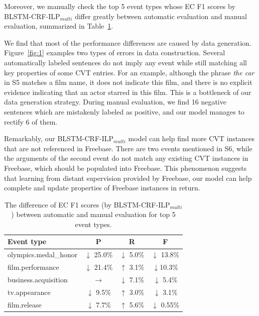 Moreover, %
 we manually check the top 5 event types whose EC F1 scores by BLSTM-CRF-ILP$_{multi}$ differ greatly between automatic evaluation and manual evaluation, summarized in Table~\ref{tab:4}.

We find that most of the performance differences are caused by data generation. Figure~\ref{fig:1} examples two types of errors in data construction. Several automatically labeled sentences do not imply any event while still matching all key properties of some CVT entries. For an example, although the phrase \emph{the car} in S5 matches a film name, it does not indicate this film, and there is no explicit evidence indicating that an actor starred in this film. This is a bottleneck of our data generation strategy. During manual evaluation, we find 16 negative sentences which are mistakenly labeled as positive, and our model manages to rectify 6 of them.

Remarkably, our BLSTM-CRF-ILP$_{multi}$ model can help find more CVT instances that are not referenced in Freebase. There are two events mentioned in S6, while the arguments of the second event do not match any existing CVT instances in Freebase, which should be populated into Freebase. %
This phenomenon suggests that learning from distant supervision provided by Freebase, our model can help complete and update properties of Freebase instances in return.

\begin{table}[h]
\small
\centering
\begin{tabular}{|l|c|c|c|} \hline
	Event type & P & R & F \\ \hline
	olympics.medal\_honor%
	& $\downarrow$ 25.0\% & $\downarrow$ 5.0\% & $\downarrow$ 13.8\% \\ \hline
	film.performance & $\downarrow$ 21.4\% & $\uparrow$ 3.1\% & $\downarrow$10.3\% \\ \hline
	business.acquisition & $\rightarrow$ & $\downarrow$ 7.1\% & $\downarrow$ 5.4\% \\ \hline
	tv.appearance%
	& $\downarrow$ 9.5\% & $\uparrow$ 3.0\% & $\downarrow$ 3.1\% \\ \hline
	film.release%
	& $\downarrow$ 7.7\% & $\uparrow$ 5.6\% & $\downarrow$ 0.55\% \\ \hline
\end{tabular}
\caption{The difference of EC F1 scores (by BLSTM-CRF-ILP$_{multi}$) between automatic and manual evaluation for top 5 event types.\label{tab:4}}
\end{table}

